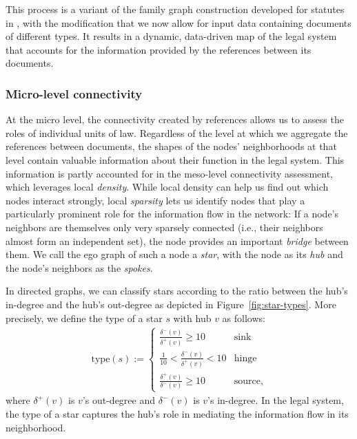 \documentclass[utf8,sort&compress,table,hidelinks]{frontiersFPHY} %
\begin{document}
This process is a variant of the family graph construction developed for statutes in \cite{katz2020}, 
with the modification that we now allow for input data containing documents of different types.
It results in a dynamic, data-driven map of the legal system that accounts for the information provided by the references between its documents.

\vspace*{6pt}
\subsubsection{Micro-level connectivity}
\label{subsubsec:methods:connectivity:micro}

At the micro level, the connectivity created by references allows us to assess the roles of individual units of law. 
Regardless of the level at which we aggregate the references between documents, 
the shapes of the nodes' neighborhoods at that level contain valuable information about their function in the legal system. 
This information is partly accounted for in the meso-level connectivity assessment, which leverages local \emph{density}.
While local density can help us find out which nodes interact strongly, local \emph{sparsity} lets us identify nodes that play a particularly prominent role for the information flow in the network: 
If a node's neighbors are themselves only very sparsely connected (i.e., their neighbors almost form an independent set), the node provides an important \emph{bridge} between them.
We call the ego graph of such a node a \emph{star}, 
with the node as its \emph{hub} and the node's neighbors as the \emph{spokes}.

In directed graphs, we can classify stars according to the ratio between the hub's in-degree and the hub's out-degree as depicted in Figure~\ref{fig:star-types}.
More precisely, we define the type of a star $s$ with hub $v$ as follows:
\begin{align*}
	\text{type}(s) := \begin{cases}
		\frac{\delta^-(v)}{\delta^+(v)} \geq 10&\text{sink}\\
		\frac{1}{10} < \frac{\delta^-(v)}{\delta^+(v)} < 10&\text{hinge}\\
		\frac{\delta^+(v)}{\delta^-(v)} \geq 10&\text{source},
	\end{cases}
\end{align*}
where $\delta^+(v)$ is $v$'s out-degree and $\delta^-(v)$ is $v$'s in-degree.
In the legal system, the type of a star captures the hub's role in mediating the information flow in its neighborhood.
\end{document}
